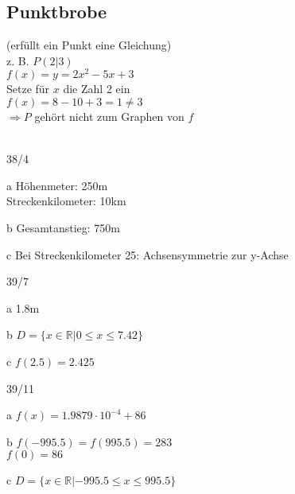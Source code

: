 \subsection{Punktbrobe}
(erfüllt ein Punkt eine Gleichung) \\
z. B. $P(2|3)$ \\
$f(x) = y = 2x^2 - 5x + 3$ \\
Setze für $x$ die Zahl 2 ein \\
$f(x) = 8 - 10 + 3 = 1 \neq 3$ \\
$\Rightarrow P$ gehört nicht zum Graphen von $f$ \\\\
\begin{onepage}
  \begin{exercise}{38/4}
    \item [a]
    Höhenmeter: 250m \\
    Streckenkilometer: 10km
    \item [b]
    Gesamtanstieg: 750m
    \item [c]
    Bei Streckenkilometer 25: Achsensymmetrie zur y-Achse    
  \end{exercise}
\end{onepage}
\begin{onepage}
  \begin{exercise}{39/7}
    \item [a]
    1.8m
    \item [b]
    $D = \{x \in \mathbb{R} | 0 \leq x \leq 7.42\}$
    \item [c]
    $f(2.5) = 2.425$
  \end{exercise}
\end{onepage}
\begin{onepage}
  \begin{exercise}{39/11}
    \item [a]
    $f(x) = 1.9879 \cdot 10^{-4} + 86$
    \item [b]
    $f(-995.5) = f(995.5) = 283$ \\
    $f(0) = 86$
    \item [c]
    $D = \{x \in \mathbb{R} | -995.5 \leq x \leq 995.5\}$
  \end{exercise}
\end{onepage}

